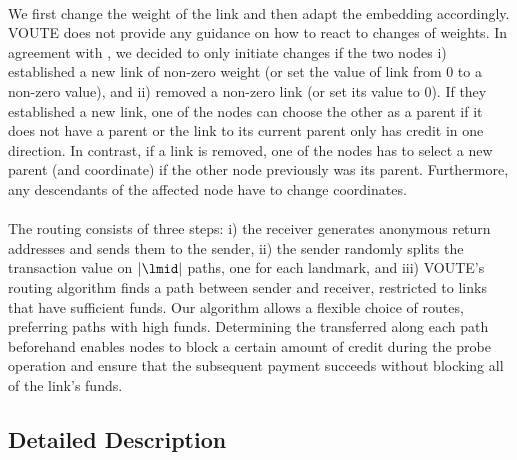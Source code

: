\paragraph*{\setC} We first change the weight of the link and then adapt the embedding accordingly. 
VOUTE does not provide any guidance on how to react to changes of weights. In agreement with \setRoute , we decided to only initiate changes if the two nodes i) established a new link of non-zero weight (or set the value of link from 0 to a non-zero value), and ii) removed a non-zero link (or set its value to 0). 
If they established a new link, one of the nodes can choose the other as a parent if it does not have a parent or the link to its current parent only has credit in one direction. In contrast, if a link is removed, one of the nodes has to select a new parent (and coordinate) if the other node previously was its parent. Furthermore, any descendants of the affected node have to change coordinates.   

\paragraph*{\routePay} The routing consists of three steps: i) the receiver generates anonymous return addresses and sends them to the sender,
ii) the sender randomly splits the transaction value on $|\lmid|$ paths, one for each landmark, and iii)
VOUTE's routing algorithm finds a path between sender and receiver, restricted to links that have sufficient funds.  
Our algorithm allows a flexible choice of routes, preferring paths with high funds. Determining the \money transferred along each path beforehand enables nodes to block a certain amount of credit during the probe operation and ensure that the subsequent payment succeeds without blocking all of the link's funds.  
 

 

\subsection{Detailed Description}

